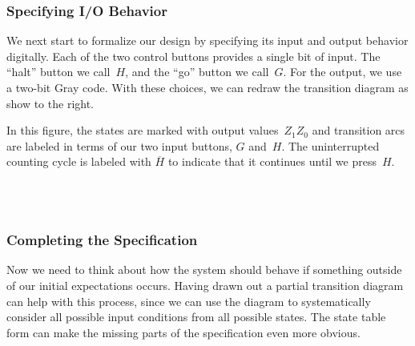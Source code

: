\subsubsection{Specifying I/O Behavior}

\begin{minipage}{3.25in}
We next start to formalize our design by specifying its input and 
output behavior digitally.  Each of the two control buttons provides
a single bit of input.  The ``halt'' button we call~$H$, and the
``go'' button we call~$G$.
%
For the output, we use a two-bit 
Gray code.  With these choices, we can redraw the transition diagram 
as show to the right.\mpline

In this figure, the states are marked with output values~$Z_1Z_0$ and
transition arcs are labeled in terms of our two input buttons, $G$ and~$H$.  
The uninterrupted counting cycle is labeled with $\overline{H}$
to indicate that it continues until we press~$H$.
\end{minipage}\hspace{.25in}%
\begin{minipage}{3in}
\end{minipage}\\ \\

\subsubsection{Completing the Specification}

Now we need to think about how the system should behave if something 
outside of our initial expectations occurs.  Having drawn out a partial
transition diagram can help with this process, since we can use the
diagram to systematically consider all possible input conditions from
all possible states.  The state table form can make the missing
parts of the specification even more obvious.



